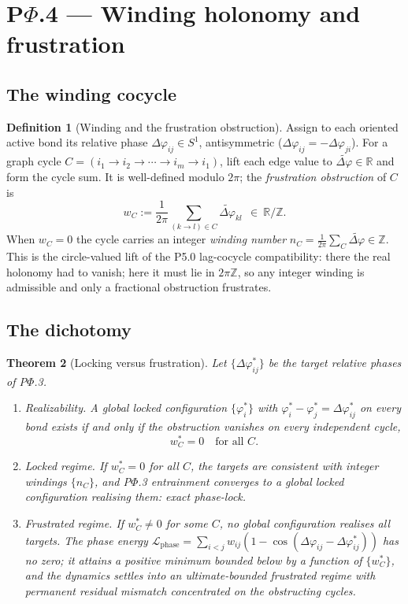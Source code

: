 \documentclass[11pt,a4paper]{article}
\theoremstyle{definition}
\newtheorem{definition}{Definition}[section]
\theoremstyle{plain}
\newtheorem{theorem}[definition]{Theorem}
\theoremstyle{remark}
\begin{document}
\section{P$\Phi$.4 --- Winding holonomy and frustration}

\subsection{The winding cocycle}

\begin{definition}[Winding and the frustration obstruction]\label{def:winding}
Assign to each oriented active bond its relative phase \(\Delta\varphi_{ij}\in S^1\),
antisymmetric (\(\Delta\varphi_{ij}=-\Delta\varphi_{ji}\)). For a graph cycle
\(C=(i_1\!\to\! i_2\!\to\!\cdots\!\to\! i_m\!\to\! i_1)\), lift each edge value to
\(\widetilde{\Delta\varphi}\in\mathbb R\) and form the cycle sum. It is well-defined modulo
\(2\pi\); the \emph{frustration obstruction} of \(C\) is
\[
\boxed{\;
w_C:=\frac{1}{2\pi}\sum_{(k\to l)\in C}\widetilde{\Delta\varphi}_{kl}\ \ \in\ \mathbb R/\mathbb Z .
\;}
\]
When \(w_C=0\) the cycle carries an integer \emph{winding number}
\(n_C=\tfrac{1}{2\pi}\sum_C\widetilde{\Delta\varphi}\in\mathbb Z\). This is the circle-valued
lift of the P5.0 lag-cocycle compatibility: there the real holonomy had to vanish; here it
must lie in \(2\pi\mathbb Z\), so any integer winding is admissible and only a fractional
obstruction frustrates.
\end{definition}

\subsection{The dichotomy}

\begin{theorem}[Locking versus frustration]\label{thm:frustration}
Let \(\{\Delta\varphi_{ij}^{*}\}\) be the target relative phases of P$\Phi$.3.
\begin{enumerate}[label=\textup{(\alph*)},leftmargin=1.2cm]
\item \emph{Realizability.} A global locked configuration \(\{\varphi_i^{*}\}\) with
\(\varphi_i^{*}-\varphi_j^{*}=\Delta\varphi_{ij}^{*}\) on every bond exists if and only if the
obstruction vanishes on every independent cycle,
\[
w_C^{*}=0\quad\text{for all }C .
\]
\item \emph{Locked regime.} If \(w_C^{*}=0\) for all \(C\), the targets are consistent with
integer windings \(\{n_C\}\), and P$\Phi$.3 entrainment converges to a global locked
configuration realising them: \emph{exact} phase-lock.
\item \emph{Frustrated regime.} If \(w_C^{*}\neq0\) for some \(C\), no global configuration
realises all targets. The phase energy
\(\mathcal L_{\mathrm{phase}}=\sum_{i<j}w_{ij}(1-\cos(\Delta\varphi_{ij}-\Delta\varphi_{ij}^{*}))\)
has no zero; it attains a positive minimum bounded below by a function of \(\{w_C^{*}\}\), and
the dynamics settles into an \emph{ultimate-bounded frustrated regime} with permanent residual
mismatch concentrated on the obstructing cycles.
\end{enumerate}
\end{theorem}
\end{document}
